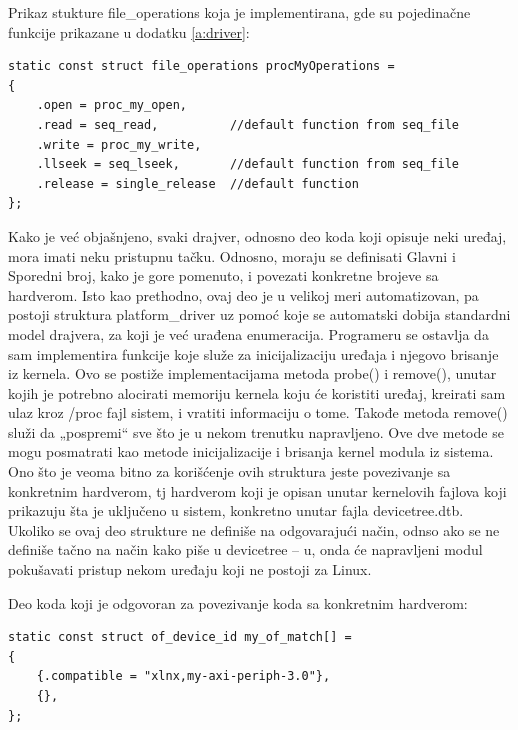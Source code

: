 \documentclass[a4paper, 12pt, diplomski]{etf}
\begin{document}
	Prikaz stukture file\_operations koja je implementirana, gde su pojedinačne funkcije prikazane u dodatku \ref{a:driver}:

\begin{verbatim}
static const struct file_operations procMyOperations =
{
    .open = proc_my_open,
    .read = seq_read,          //default function from seq_file
    .write = proc_my_write,
    .llseek = seq_lseek,       //default function from seq_file
    .release = single_release  //default function
};
\end{verbatim}

	Kako je već objašnjeno, svaki drajver, odnosno deo koda koji opisuje neki uređaj, mora imati neku pristupnu tačku. Odnosno, moraju se definisati Glavni i Sporedni broj, kako je gore pomenuto, i povezati konkretne brojeve sa hardverom. Isto kao prethodno, ovaj deo je u velikoj meri automatizovan, pa postoji struktura platform\_driver uz pomoć koje se automatski dobija standardni model drajvera, za koji je već urađena enumeracija. Programeru se ostavlja da sam implementira funkcije koje služe za inicijalizaciju uređaja i njegovo brisanje iz kernela. Ovo se postiže implementacijama metoda probe() i remove(), unutar kojih je potrebno alocirati memoriju kernela koju će koristiti uređaj, kreirati sam ulaz kroz /proc fajl sistem, i vratiti informaciju o tome. Takođe metoda remove() služi da „pospremi“ sve što je u nekom trenutku napravljeno. Ove dve metode se mogu posmatrati kao metode inicijalizacije i brisanja kernel modula iz sistema. Ono što je veoma bitno za korišćenje ovih struktura jeste povezivanje sa konkretnim hardverom, tj hardverom koji je opisan unutar kernelovih fajlova koji prikazuju šta je uključeno u sistem, konkretno unutar fajla devicetree.dtb. Ukoliko se ovaj deo strukture ne definiše na odgovarajući način, odnso ako se ne definiše tačno na način kako piše u devicetree – u, onda će napravljeni modul pokušavati pristup nekom uređaju koji ne postoji za Linux.

	\pagebreak

	Deo koda koji je odgovoran za povezivanje koda sa konkretnim hardverom:

\begin{verbatim}
static const struct of_device_id my_of_match[] =
{
    {.compatible = "xlnx,my-axi-periph-3.0"},
    {},
};
\end{verbatim}
\end{document}
